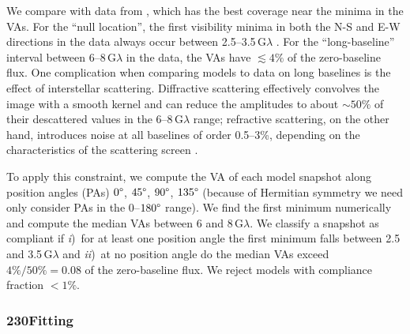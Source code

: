 We compare with data from \aprilvii, which has the best \uv
coverage near the minima in the VAs.
For the ``null location'', the first visibility minima in both the N-S and E-W directions in the data always occur between 2.5--3.5\,$\mathrm{G}\lambda$ .
For the ``long-baseline'' interval between 6--8\,$\mathrm{G}\lambda$ in the data,
the VAs have $\lesssim 4\%$ of the zero-baseline flux.
One complication when comparing models to data on long baselines is
the effect of interstellar scattering.
Diffractive scattering effectively convolves the image with a smooth
kernel and can reduce the amplitudes to about $\sim 50\%$ of their
descattered values in the 6--8\,$\mathrm{G}\lambda$ range; refractive
scattering, on the other hand, introduces noise at all baselines of
order 0.5--3\%, depending on the characteristics of the
scattering screen \citep{2018arXiv180501242P, 2018ApJ...865..104J}.

To apply this constraint, we compute the VA of each model snapshot
along position angles (PAs) $0\degree$, $45\degree$, $90\degree$,
$135\degree$ (because of Hermitian symmetry we need only consider PAs
in the 0--$180\degree$ range).
We find the first minimum numerically and compute the median VAs
between 6 and 8\,$\mathrm{G}\lambda$.
We classify a snapshot as compliant if
\emph{i})~for at least one position angle the first minimum falls
between 2.5 and 3.5\,$\mathrm{G}\lambda$ and
\emph{ii})~at no position angle do the median VAs exceed $4\% / 50\% =
0.08$ of the zero-baseline flux.
We reject models with compliance fraction $< 1\%$.

\subsubsection{230\GHz \Mring Fitting}

